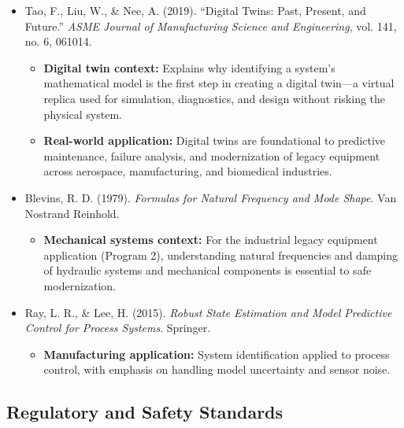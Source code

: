 \documentclass[11pt,letterpaper]{article}
\begin{document}
\begin{itemize}
    \item Tao, F., Liu, W., \& Nee, A. (2019). ``Digital Twins: Past, Present, and Future.'' \textit{ASME Journal of Manufacturing Science and Engineering}, vol. 141, no. 6, 061014.
    \begin{itemize}
        \item \textbf{Digital twin context:} Explains why identifying a system's mathematical model is the first step in creating a digital twin—a virtual replica used for simulation, diagnostics, and design without risking the physical system.
        \item \textbf{Real-world application:} Digital twins are foundational to predictive maintenance, failure analysis, and modernization of legacy equipment across aerospace, manufacturing, and biomedical industries.
    \end{itemize}

    \item Blevins, R. D. (1979). \textit{Formulas for Natural Frequency and Mode Shape}. Van Nostrand Reinhold.
    \begin{itemize}
        \item \textbf{Mechanical systems context:} For the industrial legacy equipment application (Program 2), understanding natural frequencies and damping of hydraulic systems and mechanical components is essential to safe modernization.
    \end{itemize}

    \item Ray, L. R., \& Lee, H. (2015). \textit{Robust State Estimation and Model Predictive Control for Process Systems}. Springer.
    \begin{itemize}
        \item \textbf{Manufacturing application:} System identification applied to process control, with emphasis on handling model uncertainty and sensor noise.
    \end{itemize}
\end{itemize}

\subsection*{Regulatory and Safety Standards}
\end{document}
